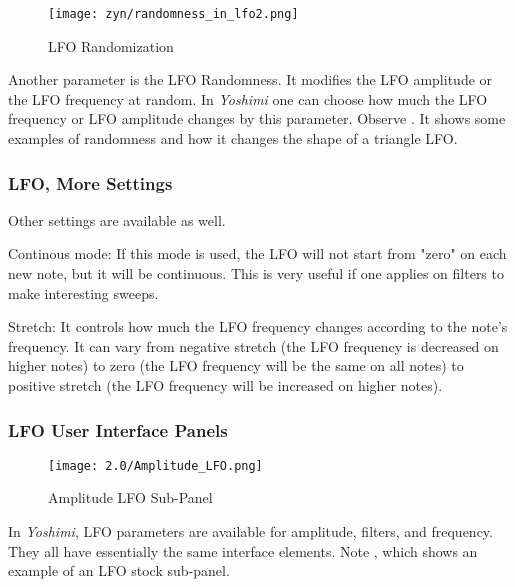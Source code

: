 \begin{figure}[H]
   \centering
   \texttt{[image: zyn/randomness\_in\_lfo2.png]}
   \caption[LFO Randomization]{LFO Randomization}
   \label{fig:randomness_in_lfo}
\end{figure}

   Another parameter is the LFO Randomness. It modifies the LFO amplitude or
   the LFO frequency at random. In \textsl{Yoshimi}
   one can choose how much the LFO
   frequency or LFO amplitude changes by this parameter.
   Observe .
   It shows some examples of randomness and how it changes the shape of a
   triangle LFO.

\subsubsection{LFO, More Settings}
\label{subsubsec:lfo_more_settings}

   Other settings are available as well.

   Continous mode: If this mode is used, the LFO will not start from "zero" on
   each new note, but it will be continuous. This is very useful if one
   applies on filters to make interesting sweeps.

   Stretch: It controls how much the LFO frequency changes according to the
   note’s frequency. It can vary from negative stretch (the LFO frequency is
   decreased on higher notes) to zero (the LFO frequency will be the same
   on all notes) to positive stretch (the LFO frequency will be
   increased on higher notes).

\subsubsection{LFO User Interface Panels}
\label{subsubsec:lfo_user_interface_panels}

   \setcounter{ItemCounter}{0}      %

\begin{figure}[H]
   \centering
   \texttt{[image: 2.0/Amplitude\_LFO.png]}
   \caption[Amplitude LFO Sub-Panel]{Amplitude LFO Sub-Panel}
   \label{fig:amplitude_lfo}
\end{figure}

   In \textsl{Yoshimi}, LFO parameters are available for amplitude, filters,
   and frequency.  They all have essentially the same interface elements.
   Note , which
   shows an example of an LFO stock sub-panel.

